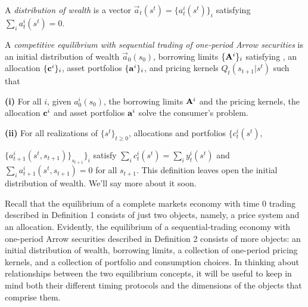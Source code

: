  \medskip
{}  A {\it distribution of wealth} is
a vector $\vec {a}_t(s^t) = \{a_t^i(s^t)\}_i$ satisfying
$\sum_i a_t^i(s^t) = 0$.
\medskip


 A {\it competitive equilibrium with sequential trading of one-period Arrow securities} is
an initial distribution of wealth $\vec { a}_0(s_0)$, 
borrowing limits $\{{\bf A}^i\}_i$ satisfying 
, 
an allocation $\{{\bf c}^i\}_i$, asset portfolios 
$\{{\bf a}^i\}_i$, and pricing
kernels $Q_t(s_{t+1} | s^t)$ such that

\medskip
\noindent
{\bf (i)} For all $i$,
given $ a^i_0(s_0)$, the borrowing 
limits ${\bf A}^i$ and the pricing kernels, 
the allocation ${\bf c}^i$ and asset portfolios
${\bf a}^i$ solve the consumer's problem.

\medskip
\noindent
{\bf (ii)} For all realizations of $\{s^t\}_{t\geq0}$,
allocations and   portfolios
$\{c^i_t(s^t), $

\noindent
$\{a^i_{t+1}(s^t, s_{t+1})\}_{s_{t+1}}\}_i$
satisfy
$\sum_i c^i_t(s^t) = \sum_i y_t^i(s^t)$ and
$\sum_i a_{t+1}^i(s^t, s_{t+1}) = 0$ 
for all $s_{t+1}$.
\medskip
\noindent This definition leaves open the initial
distribution of wealth. We'll say more about it  soon.  %

Recall that  the  equilibrium of a complete markets economy with time $0$ trading described in Definition 1 consists of just two
objects, namely, a price system and an allocation.  Evidently,  the  equilibrium of a sequential-trading economy with one-period Arrow securities
described in Definition 2 consists of more objects: an initial distribution of wealth, borrowing limits, a collection of one-period pricing kernels, and a collection of portfolio and consumption choices. In thinking about  relationships between  the two equilibrium concepts, 
it will be useful to keep in mind both their different timing protocols and the dimensions of the objects that comprise them.



